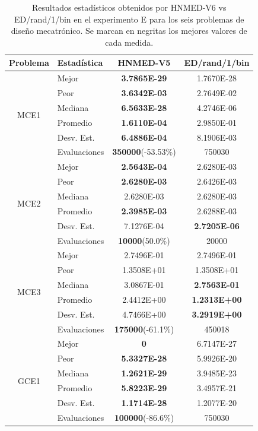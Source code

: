 \begin{table}
	\centering
	\captionsetup{width=.85\linewidth}
	\caption[Resultados estadísticos obtenidos por HNMED-V6 vs ED/rand/1/bin en el experimento E
		para los seis problemas de diseño mecatrónico.]{Resultados estadísticos obtenidos por HNMED-V6 vs ED/rand/1/bin en el experimento E
		para los seis problemas de diseño mecatrónico. Se marcan en negritas los
		mejores valores de cada medida.} \label{tab:Resultados estadísticos obtenidos por variantes HNMED6 y ED  en experimento E.}
	\begin{tabular}{clcc} 
		\hline
		Problema              & Estadística  & HNMED-V5 & ED/rand/1/bin  \\ 
		\hline
		\multirow{6}{*}{MCE1} & Mejor        & \textbf{3.7865E-29} &1.7670E-28          \\
		& Peor         &\textbf{3.6342E-03}&2.7649E-02
		\\
		& Mediana      &\textbf{6.5633E-28}&4.2746E-06            \\
		& Promedio     &\textbf{1.6110E-04}&2.9850E-01            \\
		& Desv. Est.   &\textbf{6.4886E-04}& 8.1906E-03
		\\
		& Evaluaciones &\textbf{350000}(-53.53\%)  &  750030       \\
		\hline
		
		\multirow{6}{*}{MCE2} & Mejor        &\textbf{2.5643E-04}&2.6280E-03
		\\
		& Peor         &\textbf{2.6280E-03}&2.6426E-03  \\
		& Mediana      &2.6280E-03&2.6280E-03   \\
		& Promedio     &\textbf{2.3985E-03}&2.6288E-03   \\
		& Desv. Est.   &7.1276E-04&\textbf{2.7205E-06} \\
		& Evaluaciones &\textbf{10000}(50.0\%) &20000                \\
		\hline
		
		\multirow{6}{*}{MCE3} & Mejor        &2.7496E-01&2.7496E-01  \\
		& Peor         &1.3508E+01&1.3508E+01     \\
		& Mediana      &3.0867E-01&\textbf{2.7563E-01} \\
		& Promedio     &2.4412E+00&\textbf{1.2313E+00}\\
		& Desv. Est.   &4.7466E+00&\textbf{3.2919E+00}\\
		& Evaluaciones &\textbf{175000}(-61.1\%)& 450018 \\
		\hline
		\multirow{6}{*}{GCE1} & Mejor        &\textbf{0}&6.7147E-27\\
		& Peor         &\textbf{5.3327E-28}&5.9926E-20\\
		& Mediana      &\textbf{1.2621E-29}&3.9485E-23\\
		& Promedio     &\textbf{5.8223E-29}&3.4957E-21\\
		& Desv. Est.   &\textbf{1.1714E-28}&1.2077E-20\\
		& Evaluaciones &\textbf{100000}(-86.6\%)&750030 \\
		\hline
		

\end{tabular}
\end{table}
